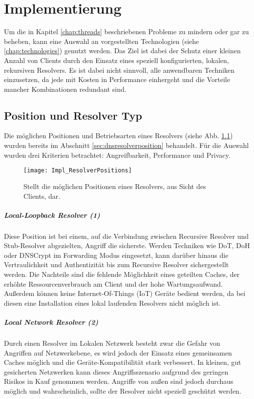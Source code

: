 \chapter{Implementierung}
\label{chap:implementation}

Um die in Kapitel \ref{chap:threads} beschriebenen Probleme zu mindern oder gar zu beheben, kann eine Auswahl an vorgestellten Technologien (siehe \ref{chap:technologies}) genutzt werden. Das Ziel ist dabei der Schutz einer kleinen Anzahl von Clients durch den Einsatz eines speziell konfigurierten, lokalen, rekursiven Resolvers. Es ist dabei nicht sinnvoll, alle anwendbaren Techniken einzusetzen, da jede mit Kosten in Performance einhergeht und die Vorteile mancher Kombinationen redundant sind.

\section{Position und Resolver Typ}
Die möglichen Positionen und Betriebsarten eines Resolvers (siehe Abb. \ref{img:impl-resolverpositions}) wurden bereits im Abschnitt \ref{sec:dnsresolverposition} behandelt. Für die Auswahl wurden drei Kriterien betrachtet: Angreifbarkeit, Performance und Privacy.
\begin{figure}[hb]
    \centering
    \texttt{[image: Impl\_ResolverPositions]}
    \caption{Stellt die möglichen Positionen eines Resolvers, aus Sicht des Clients, dar.}
    \label{img:impl-resolverpositions}
\end{figure}

\paragraph{Local-Loopback Resolver (1)}
Diese Position ist bei einem, auf die Verbindung zwischen Recursive Resolver und Stub-Resolver abgezielten, Angriff die sicherste. Werden Techniken wie DoT, DoH oder DNSCrypt im Forwarding Modus eingesetzt, kann darüber hinaus die Vertraulichkeit und Authentizität bis zum Recursive Resolver sichergestellt werden. Die Nachteile sind die fehlende Möglichkeit eines geteilten Caches, der erhöhte Ressourcenverbrauch am Client und der hohe Wartungsaufwand. Außerdem können keine Internet-Of-Things (IoT) Geräte bedient werden, da bei diesen eine Installation eines lokal laufenden Resolvers nicht möglich ist.

\paragraph{Local Network Resolver (2)}
Durch einen Resolver im Lokalen Netzwerk besteht zwar die Gefahr von Angriffen auf Netzwerkebene, es wird jedoch der Einsatz eines gemeinsamen Caches möglich und die Geräte-Kompatibilität stark verbessert. In kleinen, gut gesicherten Netzwerken kann dieses Angriffsszenario aufgrund des geringen Risikos in Kauf genommen werden. Angriffe von außen sind jedoch durchaus möglich und wahrscheinlich, sollte der Resolver nicht speziell geschützt werden.

